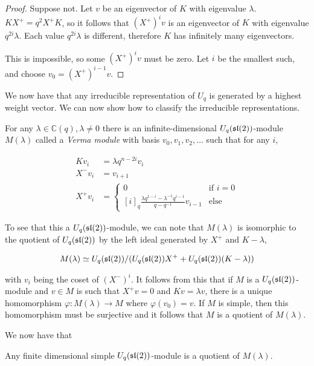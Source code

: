 \begin{proof}

    Suppose not. Let $v$ be an eigenvector of $K$ with eigenvalue $\lambda$.
    $K X^+ = q^2  X^+ K$, so it follows that $(X^+)^i v$ is an
    eigenvector of $K$ with eigenvalue $q^{2i}\lambda$. Each value
    $q^{2i}\lambda$ is different, therefore $K$ has infinitely many
    eigenvectors. 

    This is impossible, so some $(X^+)^i v$ must be zero. Let $i$ be the
    smallest such, and choose $v_0 = (X^+)^{i-1} v$.
\end{proof}

We now have that any irreducible representation of $U_q$ is generated by a
highest weight vector. We can now show how to classify the irreducible
representations. 

For any $\lambda \in \mathbb{C}(q), \lambda \neq 0$ there is an
infinite-dimensional $U_q(\mathfrak{sl}(2))$-module $M(\lambda)$ called a \emph{Verma
module} with basis $v_0, v_1, v_2, \ldots$ such that for any $i$,

\begin{align}
    Kv_i &= \lambda q^{n-2i}v_i \\
    X^-v_i &= v_{i+1} \\
     X^+ v_i &= \begin{cases} 0 & \text{if $i = 0$} \\
                          [i]_q \frac{\lambda q^{1-i} - \lambda^{-1}q^{i-1}}{q - q^{-1}}v_{i-1} & \text{else}
            \end{cases}
\end{align}

To see that this a $U_q(\mathfrak{sl}(2))$-module, we can note that $M(\lambda)$ is isomorphic to the quotient of $U_q(\mathfrak{sl}(2))$ by the left ideal generated by $X^+$ and $K-\lambda$,

\begin{equation}
    M(\lambda) \simeq U_q(\mathfrak{sl}(2))/(U_q(\mathfrak{sl}(2)) X^+  + U_q(\mathfrak{sl}(2))(K-\lambda))
\end{equation}

with $v_i$ being the coset of $(X^-)^i$. It follows from this that if $M$ is a
$U_q(\mathfrak{sl}(2))$-module and $v \in M$ is such that $X^+ v = 0$ and $Kv = \lambda v$, there
is a unique homomorphism $\varphi: M(\lambda) \to M$ where $\varphi(v_0) = v$.
If $M$ is simple, then this homomorphism must be  surjective and it follows
that $M$ is a quotient of $M(\lambda)$. 

We now have that 
\begin{claim}
    Any finite dimensional simple $U_q(\mathfrak{sl}(2))$-module is a quotient of $M(\lambda)$.
\end{claim}


